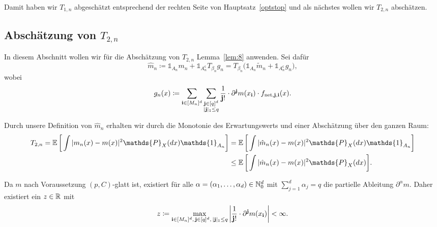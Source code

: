 {Damit haben wir $T_{1,n}$ abgeschätzt entsprechend der rechten Seite von Hauptsatz~\ref{optstop} und als nächstes wollen wir $T_{2,n}$ abschätzen.

\subsection{Abschätzung von $T_{2,n}$}

In diesem Abschnitt wollen wir für die Abschätzung von $T_{2,n}$ Lemma~\ref{lem:8} anwenden.
Sei dafür $$\hat{m}_n \coloneqq \mathds{1}_{A_n}m_n + \mathds{1}_{A_n^{\mathsf{c}}}T_{\beta_n}g_n = T_{\beta_n}\big(\mathds{1}_{A_n}\tilde{m}_n + \mathds{1}_{A_n^{\mathsf{c}}}g_n \big),$$
wobei
$$g_n(x) \coloneqq \sum_{\mathbf{i} \in [M_n]^d} \sum_{\substack{ \mathbf{j} \in [q]^d \\ |\mathbf{j}|_1 \leq q}} \frac{1}{\mathbf{j}!} \cdot \partial^{\mathbf{j}}m(x_{\mathbf{i}}) \cdot f_{\mathrm{net},\mathbf{j},\mathbf{i}}(x).$$

Durch unsere Definition von $\hat{m}_n$ erhalten wir durch die Monotonie des Erwartungswerts und einer Abschätzung über den ganzen Raum:
\begin{equation}
\label{an}
\begin{split}
T_{2,n} = \E \bigg[\int |m_n(x) - m(x)|^2 \mathds{P}_X(dx) \mathds{1}_{A_n}\bigg] & = \E \bigg[\int |\hat{m}_n(x) - m(x)|^2 \mathds{P}_X(dx) \mathds{1}_{A_n}\bigg] \\
& \leq \E \bigg[\int |\hat{m}_n(x) - m(x)|^2 \mathds{P}_X(dx)\bigg].
\end{split}
\end{equation}

Da $m$ nach Voraussetzung $(p,C)$-glatt ist, existiert für alle $\alpha = (\alpha_1,\dots,\alpha_d) \in \mathbb{N}_0^d$ mit $\sum_{j = 1}^d\alpha_j = q$ die partielle Ableitung $\partial^{\alpha}m$. Daher existiert ein $z \in \mathbb{R}$ mit
\begin{equation}
\label{bound}
z \coloneqq \max_{\mathbf{i} \in [M_n]^d,\, \mathbf{j} \in [q]^d,\, |\mathbf{j}|_1 \leq q} \bigg|\frac{1}{\mathbf{j}!} \cdot \partial^{\mathbf{j}}m(x_{\mathbf{i}})\bigg| < \infty.
\end{equation}

}
